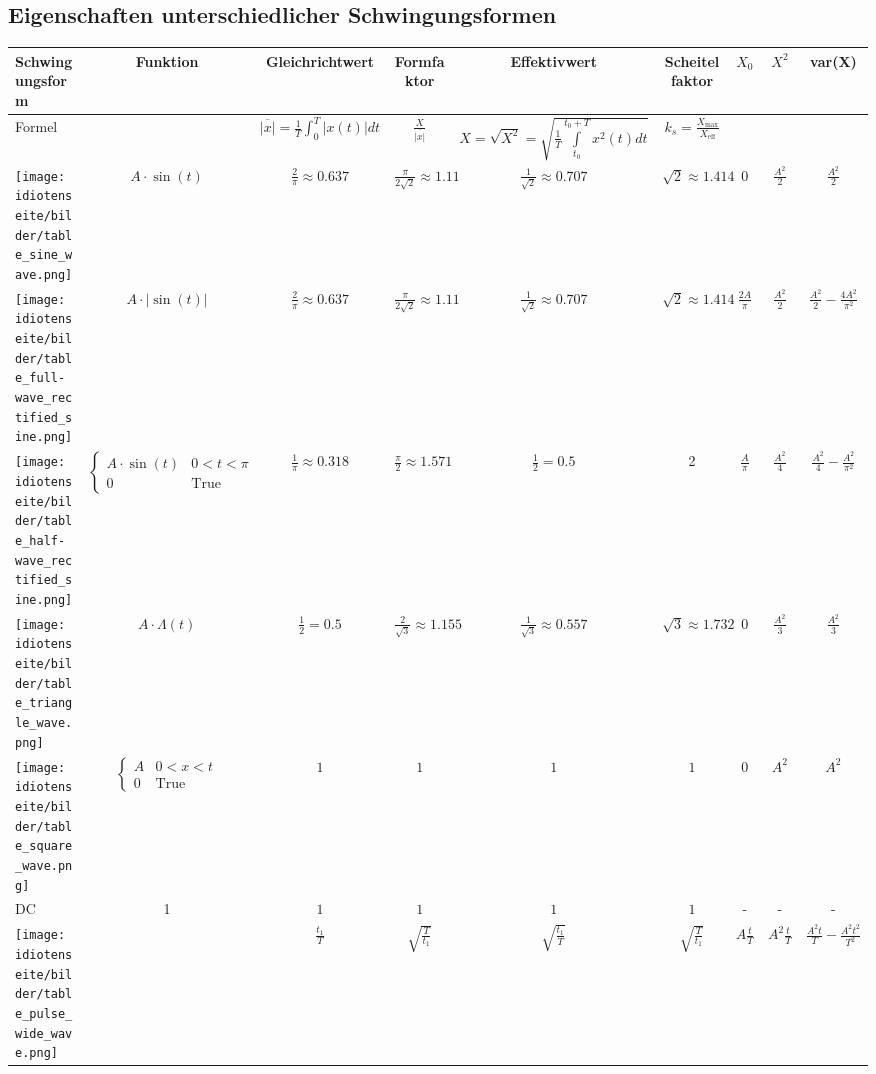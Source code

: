 \begin{sidewaystable}
\subsection{Eigenschaften unterschiedlicher Schwingungsformen}
\begin{center}
\begin{tabular}{|l|c|c|c|c|c|c|c|c|}
\hline
	Schwingungsform & Funktion & Gleichrichtwert & Formfaktor &
	Effektivwert & Scheitelfaktor & \textbf{$X_0$} & \textbf{$X^2$} & \textbf{var(X)} \\
\hline
	Formel &
	&
	$\overline{\left|x\right|} = \frac1T\int_{0}^{T}\left| x(t)\right|dt$&
	$\frac{X}{\overline{\left|x\right|}}$&
	$X = \sqrt{X^2} = \sqrt{\frac{1}{T} \int\limits ^{t_0+T}_{t_0}{x^2(t)dt}}$&
	$k_{s}=\frac{X_{\mathrm{max}}}{X_{\mathrm{eff}}}$&
	&
	&
	\\
\hline
	\texttt{[image: idiotenseite/bilder/table\_sine\_wave.png]} &
	$A\cdot\sin(t)$ &
	$\frac{2}{\pi} \approx 0.637$ &
	$\frac{\pi}{2\sqrt{2}} \approx 1.11$ &
	$\frac{1}{\sqrt{2}}\approx 0.707$ &
	$\sqrt{2}\approx 1.414$ &
	$0$ &
	$\frac{A^2}{2}$ &
	$\frac{A^2}{2}$ \\
\hline	
	\texttt{[image: idiotenseite/bilder/table\_full-wave\_rectified\_sine.png]} &
	$A\cdot|\sin(t)|$ &
	$\frac{2}{\pi} \approx 0.637$ &
	$\frac{\pi}{2\sqrt{2}} \approx 1.11$ &
	$\frac{1}{\sqrt{2}} \approx 0.707$ &
	$\sqrt{2} \approx 1.414$  &
	$\frac{2A}{\pi}$ & $\frac{A^2}{2}$ & $\frac{A^2}{2}-\frac{4A^2}{\pi^2}$
	\\
\hline
	\texttt{[image: idiotenseite/bilder/table\_half-wave\_rectified\_sine.png]} &
	$\begin{cases} A\cdot\sin (t) & 0<t<\pi  \\ 0 & \text{True}\end{cases}$ &
	$\frac{1}{\pi}\approx 0.318$ &
	$\frac{\pi}{2}\approx 1.571$ &
	$\frac{1}{2} = 0.5$	&
	2  &
	$\frac{A}{\pi}$ &
	$\frac{A^2}{4}$ & $\frac{A^2}{4}-\frac{A^2}{\pi^2}$
	\\
\hline
	\texttt{[image: idiotenseite/bilder/table\_triangle\_wave.png]} &
	$A\cdot\Lambda(t)$ &
	$\frac{1}{2}= 0.5$ &
	$\frac{2}{\sqrt{3}}\approx 1.155$ &
	$\frac{1}{\sqrt{3}}
	\approx 0.557$ &
	$\sqrt{3} \approx 1.732$ &
	$0$ &
	$\frac{A^2}{3}$ &
	$\frac{A^2}{3}$ \\
\hline	
	\texttt{[image: idiotenseite/bilder/table\_square\_wave.png]} &
	$\begin{cases} A & 0<x<t \\ 0 & \text{True}\end{cases}$ &
	$1$ &
	$1$ &
	$1$ &
	$1$ &
	$0$ &
	$A^2$ &
	$A^2$ \\
\hline	
	DC&
	1&
	$1$ &
	$1$ &
	$1$ &
	$1$  &
	-&
	-&
	-\\
\hline	
	\texttt{[image: idiotenseite/bilder/table\_pulse\_wide\_wave.png]} &
	&
	$\frac{t_1}{T}$ & $\sqrt{\frac{T}{t_1}}$ & $\sqrt{\frac{t_1}{T}}$ & $\sqrt{\frac{T}{t_1}}$ &
	$A\frac{t}{T}$ &
	$A^2\frac{t}{T}$ &
	$\frac{A^2t}{T}-\frac{A^2t^2}{T^2}$\\
\hline
\end{tabular}
\end{center}
\end{sidewaystable}

